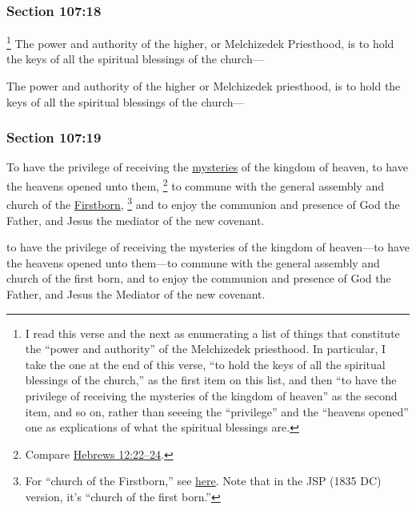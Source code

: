	\subsubsection{Section 107:18} %
		\label{DC107-18}

			\footnote{%
				I read this verse and the next as enumerating a list of things that constitute the ``power and authority'' of the Melchizedek priesthood. In particular, I take the one at the end of this verse, ``to hold the keys of all the spiritual blessings of the church,'' as the first item on this list, and then ``to have the privilege of receiving the mysteries of the kingdom of heaven'' as the second item, and so on, rather than seeeing the ``privilege'' and the ``heavens opened'' one as explications of what the spiritual blessings are.
				}%
		The power and authority of the higher, or Melchizedek Priesthood, is to hold the keys of all the spiritual blessings of the church---

		\begin{framed}
		\scriptsize
			\begin{compactdesc}
				\item[JSP] The power and authority of the higher or Melchizedek priesthood, is to hold the keys of all the spiritual blessings of the church---
			\end{compactdesc}
		\end{framed}

	\subsubsection{Section 107:19} %
		\label{DC107-19}

		To have the privilege of receiving the \hyperref[MYSTERY]{mysteries} of the kingdom of heaven, to have the heavens opened unto them,
			\footnote{%
				Compare \hyperref[HEBREWS-12-22]{Hebrews 12:22--24}.
				}%
		to commune with the general assembly and church of the \hyperref[FIRSTBORN]{Firstborn},%
			\footnote{%
				For ``church of the Firstborn,'' see \hyperref[CHURCH-PHRASES]{here}. Note that in the JSP (1835 DC) version, it's ``church of the first born.''
				}
		and to enjoy the communion and presence of God the Father, and Jesus the mediator of the new covenant.

		\begin{framed}
		\scriptsize
			\begin{compactdesc}
				\item[JSP] to have the privilege of receiving the mysteries of the kingdom of heaven---to have the heavens opened unto them---to commune with the general assembly and church of the first born, and to enjoy the communion and presence of God the Father, and Jesus the Mediator of the new covenant.
			\end{compactdesc}
		\end{framed}

